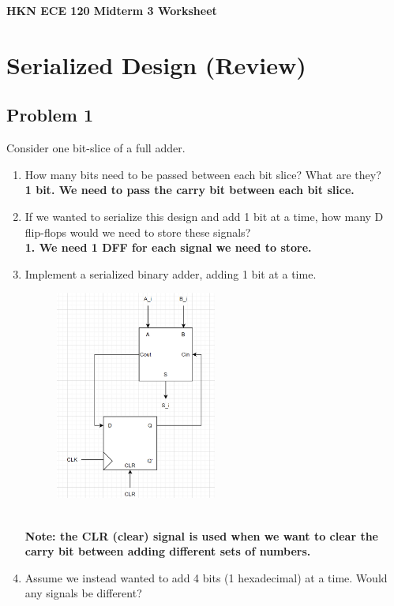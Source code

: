 \documentclass{article}
\begin{document}
\begin{center}
\textbf{
{\Large HKN ECE 120 Midterm 3 Worksheet}
} 
\end{center} 
\noindent\makebox[\linewidth]{\rule{\linewidth}{0.2pt}}

\section*{Serialized Design (Review)}
\subsection*{Problem 1}
Consider one bit-slice of a full adder.
\begin{enumerate}[label=\alph*.]
    \item How many bits need to be passed between each bit slice? What are they? \\
    \textbf{1 bit. We need to pass the carry bit between each bit slice.}
    \item If we wanted to serialize this design and add 1 bit at a time, how many D flip-flops would we need to store these signals? \\
    \textbf{1. We need 1 DFF for each signal we need to store.}
    \item Implement a serialized binary adder, adding 1 bit at a time.
    \begin{figure}[!h]
        \centering
        \includegraphics[width=0.5\textwidth]{figures/serial1c_solution.png}
    \end{figure}
    \\ \textbf{Note: the CLR (clear) signal is used when we want to clear the carry bit between adding different sets of numbers.}
    \item Assume we instead wanted to add 4 bits (1 hexadecimal) at a time. Would any signals be different?

\end{enumerate}
\end{document}
